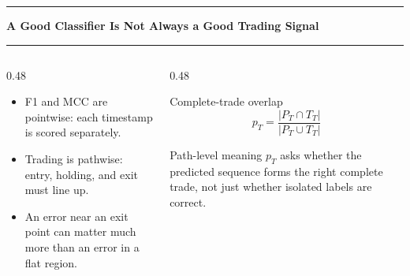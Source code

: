 \documentclass[aspectratio=169,10pt]{beamer}
\newcommand{\tightitems}{\setlength{\itemsep}{0.35em}}
\newcommand{\contentheader}[1]{%
  \vspace*{0.05em}%
  {\noindent\color{BrandOrange}\rule{0.42em}{0.42em}\hspace{0.50em}\bfseries\Large #1\par}%
  \vspace{0.15em}%
  {\color{BrandOrange}\rule{\textwidth}{1.4pt}\par}%
  \vspace{0.42em}%
}
\begin{document}
\begin{frame}[plain]
\contentheader{A Good Classifier Is Not Always a Good Trading Signal}
\begin{columns}[T,totalwidth=\textwidth]
\begin{column}{0.48\textwidth}
\begin{itemize}\tightitems
  \item F1 and MCC are pointwise: each timestamp is scored separately.
  \item Trading is pathwise: entry, holding, and exit must line up.
  \item An error near an exit point can matter much more than an error in a flat region.
\end{itemize}
\end{column}
\begin{column}{0.48\textwidth}
\begin{block}{Complete-trade overlap}
\[
p_T=\frac{|P_T\cap T_T|}{|P_T\cup T_T|}
\]
\end{block}
\begin{block}{Path-level meaning}
\(p_T\) asks whether the predicted sequence forms the right complete trade, not just whether isolated labels are correct.
\end{block}
\end{column}
\end{columns}
\end{frame}
\end{document}
